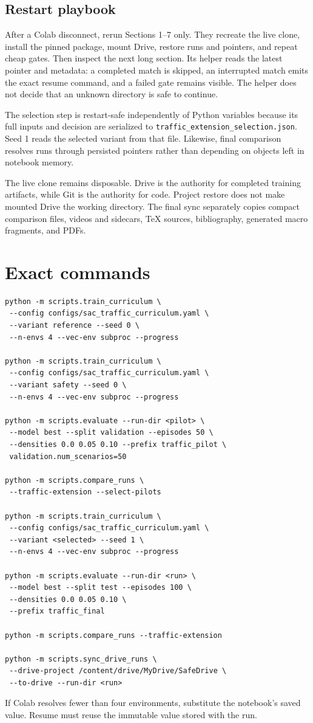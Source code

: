 \documentclass[10pt,twocolumn]{article}
\begin{document}
\subsection{Restart playbook}
After a Colab disconnect, rerun Sections 1--7 only. They recreate the live clone, install
the pinned package, mount Drive, restore runs and pointers, and repeat cheap gates. Then
inspect the next long section. Its helper reads the latest pointer and metadata: a
completed match is skipped, an interrupted match emits the exact resume command, and a
failed gate remains visible. The helper does not decide that an unknown directory is safe
to continue.

The selection step is restart-safe independently of Python variables because its full
inputs and decision are serialized to
\texttt{traffic\_extension\_selection.json}. Seed 1 reads the selected variant from that
file. Likewise, final comparison resolves runs through persisted pointers rather than
depending on objects left in notebook memory.

The live clone remains disposable. Drive is the authority for completed training
artifacts, while Git is the authority for code. Project restore does not make mounted
Drive the working directory. The final sync separately copies compact comparison files,
videos and sidecars, TeX sources, bibliography, generated macro fragments, and PDFs.

\section{Exact commands}
\begin{Verbatim}[fontsize=\scriptsize,breaklines=true,breakanywhere=true]
python -m scripts.train_curriculum \
 --config configs/sac_traffic_curriculum.yaml \
 --variant reference --seed 0 \
 --n-envs 4 --vec-env subproc --progress

python -m scripts.train_curriculum \
 --config configs/sac_traffic_curriculum.yaml \
 --variant safety --seed 0 \
 --n-envs 4 --vec-env subproc --progress

python -m scripts.evaluate --run-dir <pilot> \
 --model best --split validation --episodes 50 \
 --densities 0.0 0.05 0.10 --prefix traffic_pilot \
 validation.num_scenarios=50

python -m scripts.compare_runs \
 --traffic-extension --select-pilots

python -m scripts.train_curriculum \
 --config configs/sac_traffic_curriculum.yaml \
 --variant <selected> --seed 1 \
 --n-envs 4 --vec-env subproc --progress

python -m scripts.evaluate --run-dir <run> \
 --model best --split test --episodes 100 \
 --densities 0.0 0.05 0.10 \
 --prefix traffic_final

python -m scripts.compare_runs --traffic-extension

python -m scripts.sync_drive_runs \
 --drive-project /content/drive/MyDrive/SafeDrive \
 --to-drive --run-dir <run>
\end{Verbatim}
If Colab resolves fewer than four environments, substitute the notebook's saved value.
Resume must reuse the immutable value stored with the run.
\end{document}

